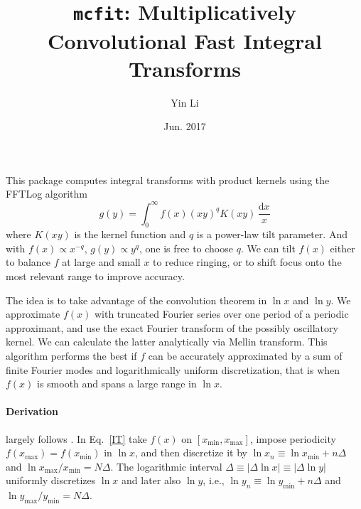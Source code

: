 \documentclass{article}
\renewcommand{\d}{\mathrm{d}}
\newcommand{\xmin}{x_\textrm{min}}
\newcommand{\xmax}{x_\textrm{max}}
\newcommand{\ymin}{y_\textrm{min}}
\newcommand{\ymax}{y_\textrm{max}}
\begin{document}
\title{\texttt{mcfit}: Multiplicatively Convolutional Fast Integral Transforms}
\author{Yin Li}
\date{Jun. 2017}
\maketitle


This package computes integral transforms with product kernels
using the FFTLog algorithm \cite{Talman78,Hamilton00}
\begin{equation}
    \label{IT}
    g(y) = \int_0^\infty f(x) (xy)^q K(xy) \,\frac{\d x}x
\end{equation}
where $K(xy)$ is the kernel function and $q$ is a power-law tilt parameter.
And with $f(x)\propto x^{-q}$, $g(y)\propto y^q$, one is free to choose $q$.
We can tilt $f(x)$ either to balance $f$ at large and small $x$ to reduce
ringing, or to shift focus onto the most relevant range to improve accuracy.

The idea is to take advantage of the convolution theorem in $\ln x$ and $\ln y$.
We approximate $f(x)$ with truncated Fourier series over one period of a
periodic approximant, and use the exact Fourier transform of the possibly
oscillatory kernel.
We can calculate the latter analytically via Mellin transform.
This algorithm performs the best if $f$ can be accurately approximated
by a sum of finite Fourier modes and logarithmically uniform discretization,
that is when $f(x)$ is smooth and spans a large range in $\ln x$.


\paragraph{Derivation} largely follows \cite{Hamilton00}.
In Eq.~\eqref{IT} take $f(x)$ on $[\xmin, \xmax]$, impose periodicity
$f(\xmax)=f(\xmin)$ in $\ln x$, and then discretize it by
$\ln x_n\equiv\ln\xmin+n\Delta$ and $\ln\xmax/\xmin=N\Delta$.
The logarithmic interval $\Delta\equiv|\Delta\ln x|\equiv|\Delta\ln y|$
uniformly discretizes $\ln x$ and later also $\ln y$,
i.e., $\ln y_n\equiv\ln\ymin+n\Delta$ and $\ln\ymax/\ymin=N\Delta$.
\end{document}
